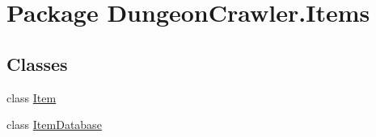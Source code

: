 \hypertarget{namespace_dungeon_crawler_1_1_items}{}\section{Package Dungeon\+Crawler.\+Items}
\label{namespace_dungeon_crawler_1_1_items}
\subsection*{Classes}
\begin{DoxyCompactItemize}
\item 
class \hyperlink{class_dungeon_crawler_1_1_items_1_1_item}{Item}
\item 
class \hyperlink{class_dungeon_crawler_1_1_items_1_1_item_database}{Item\+Database}
\end{DoxyCompactItemize}
